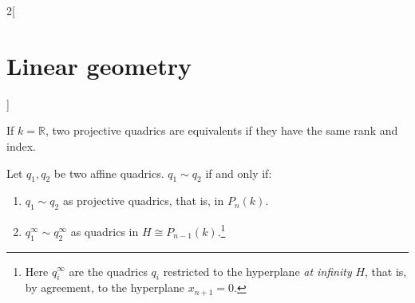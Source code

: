 \documentclass[class=article,10pt,crop=false]{standalone}
\begin{document}
\begin{multicols}{2}[\section{Linear geometry}]
\begin{theorem}
If $k=\mathbb{R}$, two projective quadrics are equivalents if they have the same rank and index.
\end{theorem}
\begin{theorem}
Let $q_1,q_2$ be two affine quadrics. $q_1\sim q_2$ if and only if:
\begin{enumerate}
    \item $q_1\sim q_2$ as projective quadrics, that is, in $P_n(k)$.
    \item $q_1^\infty\sim q_2^\infty$ as quadrics in $H\cong P_{n-1}(k)$.\footnote{Here $q_i^\infty$ are the quadrics $q_i$ restricted to the hyperplane \textit{at infinity} $H$, that is, by agreement, to the hyperplane $x_{n+1}=0$.}
\end{enumerate}
\end{theorem}
\end{multicols}
\end{document}
